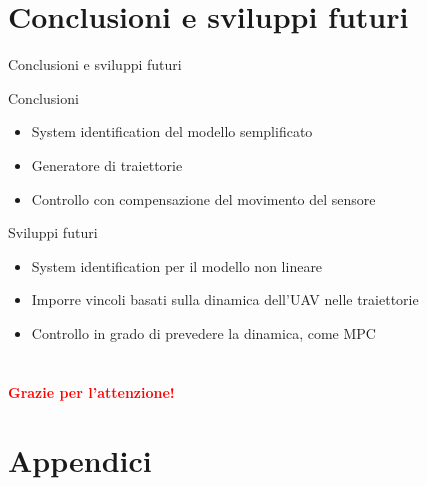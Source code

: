 \documentclass[]{beamer}
\begin{document}
	
	\section{Conclusioni e sviluppi futuri}
		
	\begin{frame}{Conclusioni e sviluppi futuri}
		\centering
		\begin{block}{Conclusioni}
			\begin{itemize}
				\item System identification del modello semplificato
				\item Generatore di traiettorie
				\item Controllo con compensazione del movimento del sensore
			\end{itemize}
		\end{block}
		\begin{block}{Sviluppi futuri}
			\begin{itemize}
				\item System identification per il modello non lineare
				\item Imporre vincoli basati sulla dinamica dell'UAV nelle traiettorie
				\item Controllo in grado di prevedere la dinamica, come MPC
			\end{itemize}
		\end{block}
	\end{frame}
	
	
	\section{}
	
	\begin{frame}
		\centering
		\Huge
		\textbf{\textcolor{red}{Grazie per l'attenzione!}}
	\end{frame}
	
	
	\section{Appendici}
	
\end{document}
